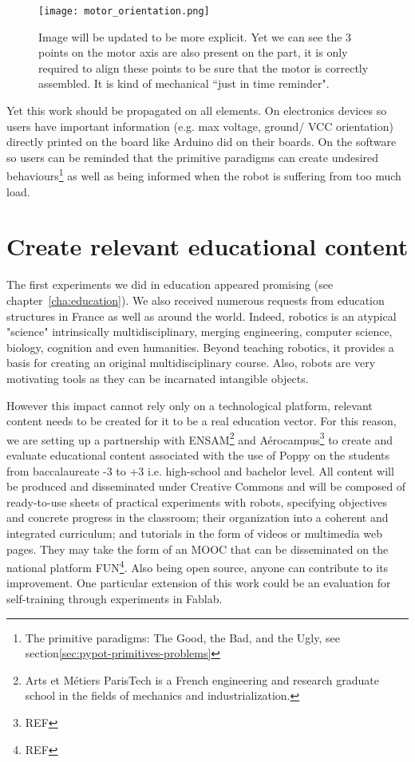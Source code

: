 \begin{figure}[tb]
    \centering
        \texttt{[image: motor\_orientation.png]}
    \caption{Image will be updated to be more explicit. Yet we can see the 3 points on the motor axis are also present on the part, it is only required to align these points to be sure that the motor is correctly assembled. It is kind of mechanical “just in time reminder".}
    \label{fig:motor_orientation}
\end{figure}

Yet this work should be propagated on all elements. On electronics devices so users have important information (e.g. max voltage, ground/ VCC orientation) directly printed on the board like Arduino did on their boards. On the software so users can be reminded that the primitive paradigms can create undesired behaviours\footnote{The primitive paradigms: The Good, the Bad, and the Ugly, see section\ref{sec:pypot-primitives-problems}} as well as being informed when the robot is suffering from too much load.

\section{Create relevant educational content} %

The first experiments we did in education appeared promising (see chapter~\ref{cha:education}). We also received numerous requests from education structures in France as well as around the world. Indeed, robotics is an atypical "science" intrinsically multidisciplinary, merging engineering, computer science, biology, cognition and even humanities. Beyond teaching robotics, it provides a basis for creating an original multidisciplinary course. Also, robots are very motivating tools as they can be incarnated intangible objects.

However this impact cannot rely only on a technological platform, relevant content needs to be created for it to be a real education vector.
For this reason, we are setting up a partnership with ENSAM\footnote{Arts et Métiers ParisTech is a French engineering and research graduate school in the fields of mechanics and industrialization.} and Aérocampus\footnote{REF} to create and evaluate educational content associated with the use of Poppy on the students from baccalaureate -3 to +3 i.e. high-school and bachelor level. All content will be produced and disseminated under Creative Commons and will be composed of ready-to-use sheets of practical experiments with robots, specifying objectives and concrete progress in the classroom; their organization into a coherent and integrated curriculum; and tutorials in the form of videos or multimedia web pages. They may take the form of an MOOC that can be disseminated on the national platform FUN\footnote{REF}. Also being open source, anyone can contribute to its improvement. One particular extension of this work could be an evaluation for self-training through experiments in Fablab.


